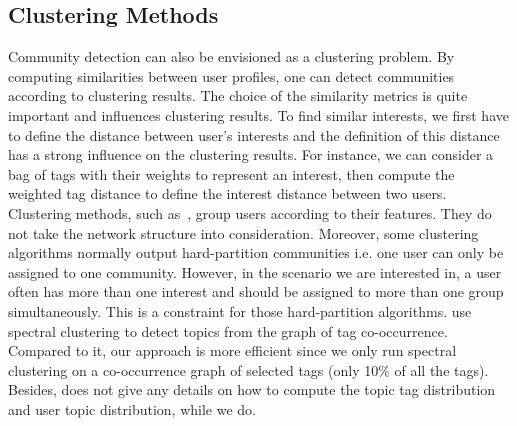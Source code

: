 \subsection{Clustering Methods}
Community detection can also be envisioned as a clustering problem. By computing similarities between user profiles, one can detect communities according to clustering results. The choice of the similarity metrics is quite important and influences clustering results. 
To find similar interests, we first have to define the distance between user's interests and the definition of this distance has a strong influence on the clustering results. For instance, we can consider a bag of tags with their
weights to represent an interest, then compute the weighted tag distance to define the interest distance between two users.
Clustering methods, such as~\cite{DBLP:conf/sigmod/XuKWCC12}\cite{DBLP:conf/icwsm/GargiLMY11}, group users according to their features. They do not take the network structure into consideration. Moreover, some clustering algorithms normally output hard-partition communities i.e. one user can only be assigned to one community. However, in the scenario we are interested in, a user often has more than one interest and should be assigned to more than one group simultaneously. This is a constraint for those hard-partition algorithms. 
\cite{Chang:2013} use spectral clustering to detect topics from the graph of tag co-occurrence. Compared to it, our approach is more efficient since we only run spectral clustering on a co-occurrence graph of selected tags (only 10\% of all the tags). Besides, \cite{Chang:2013} does not give any details on how to compute the topic tag distribution and user topic distribution, while we do.

